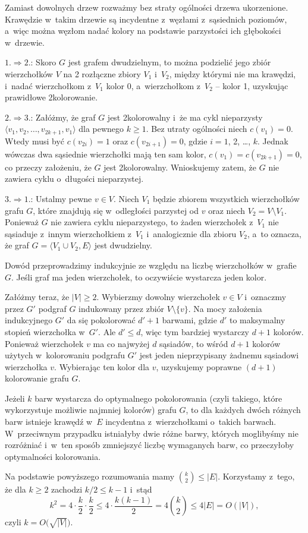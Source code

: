 
\subproblem %
Zamiast dowolnych drzew rozważmy bez straty ogólności drzewa ukorzenione.
Krawędzie w~takim drzewie są incydentne z~węzłami z~sąsiednich poziomów, a~więc można węzłom nadać kolory na podstawie parzystości ich głębokości w~drzewie.

\subproblem %
$1.\Rightarrow 2.$: Skoro $G$ jest grafem dwudzielnym, to można podzielić jego zbiór wierzchołków $V$ na 2 rozłączne zbiory $V_1$ i~$V_2$, między którymi nie ma krawędzi, i~nadać wierzchołkom z~$V_1$ kolor 0, a~wierzchołkom z~$V_2$ -- kolor 1, uzyskując prawidłowe 2\nbhyphen kolorowanie.
\medskip

$2.\Rightarrow 3.$: Załóżmy, że graf $G$ jest 2\nbhyphen kolorowalny i~że ma cykl nieparzysty $\langle v_1,v_2,\dots,v_{2k+1},v_1\rangle$ dla pewnego $k\ge1$.
Bez utraty ogólności niech $c(v_1)=0$.
Wtedy musi być $c(v_{2i})=1$ oraz $c(v_{2i+1})=0$, gdzie $i=1$, 2, \dots, $k$.
Jednak wówczas dwa sąsiednie wierzchołki mają ten sam kolor, $c(v_1)=c(v_{2k+1})=0$, co przeczy założeniu, że $G$ jest 2\nbhyphen kolorowalny.
Wnioskujemy zatem, że $G$ nie zawiera cyklu o~długości nieparzystej.
\medskip

$3.\Rightarrow 1.$: Ustalmy pewne $v\in V$.
Niech $V_1$ będzie zbiorem wszystkich wierzchołków grafu $G$, które znajdują się w~odległości parzystej od $v$ oraz niech $V_2=V\setminus V_1$.
Ponieważ $G$ nie zawiera cyklu nieparzystego, to żaden wierzchołek z~$V_1$ nie sąsiaduje z~innym wierzchołkiem z~$V_1$ i~analogicznie dla zbioru $V_2$, a~to oznacza, że graf $G=\langle V_1\cup V_2,E\rangle$ jest dwudzielny.

\subproblem %
Dowód przeprowadzimy indukcyjnie ze względu na liczbę wierzchołków w~grafie $G$.
Jeśli graf ma jeden wierzchołek, to oczywiście wystarcza jeden kolor.

Załóżmy teraz, że $|V|\ge2$.
Wybierzmy dowolny wierzchołek $v\in V$ i~oznaczmy przez $G'$ podgraf $G$ indukowany przez zbiór $V\setminus\{v\}$.
Na mocy założenia indukcyjnego $G'$ da się pokolorować $d'+1$ barwami, gdzie $d'$ to maksymalny stopień wierzchołka w~$G'$.
Ale $d'\le d$, więc tym bardziej wystarczy $d+1$ kolorów.
Ponieważ wierzchołek $v$ ma co najwyżej $d$ sąsiadów, to wśród $d+1$ kolorów użytych w~kolorowaniu podgrafu $G'$ jest jeden nieprzypisany żadnemu sąsiadowi wierzchołka $v$.
Wybierając ten kolor dla $v$, uzyskujemy poprawne $(d+1)$\nbhyphen kolorowanie grafu $G$.

\subproblem %
Jeżeli $k$ barw wystarcza do optymalnego pokolorowania (czyli takiego, które wykorzystuje możliwie najmniej kolorów) grafu $G$, to dla każdych dwóch różnych barw istnieje krawędź w~$E$ incydentna z~wierzchołkami o~takich barwach.
W~przeciwnym przypadku istniałyby dwie różne barwy, których moglibyśmy nie rozróżniać i~w~ten sposób zmniejszyć liczbę wymaganych barw, co przeczyłoby optymalności kolorowania.

Na podstawie powyższego rozumowania mamy $\binom{k}{2}\le|E|$.
Korzystamy z~tego, że dla $k\ge2$ zachodzi $k/2\le k-1$ i~stąd
\[
    k^2 = 4\cdot\frac{k}{2}\cdot\frac{k}{2} \le 4\cdot\frac{k(k-1)}{2} = 4\binom{k}{2} \le 4|E| = O(|V|),
\]
czyli $k=O\bigl(\!\sqrt{|V|}\bigr)$.
